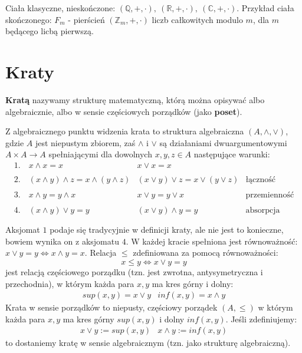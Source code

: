 \begin{przyk}
Ciała klasyczne, nieskończone: $(\mathbb{Q},+,\cdot),\ (\mathbb{R},+,\cdot),\ (\mathbb{C},+,\cdot)$. Przykład ciała skończonego: $F_m$ - pierścień $(\mathbb{Z}_m,+,\cdot)$ liczb całkowitych modulo $m$, dla $m$ będącego licbą pierwszą.
\end{przyk}

\section{Kraty}

\begin{df}
\textbf{Kratą} nazywamy strukturę matematyczną, którą można opisywać albo algebraicznie, albo w sensie częściowych porządków (jako \textbf{poset}).

Z algebraicznego punktu widzenia krata to struktura algebraiczna $(A,\wedge,\vee)$, gdzie $A$ jest niepustym zbiorem, zaś $\wedge$ i $\vee$ są działaniami dwuargumentowymi $A\times A\rightarrow A$ spełniającymi dla dowolnych $x,y,z\in A$ następujące warunki:
$$\begin{array}{lll}
1.\quad x\wedge x=x & x\vee x=x\\
\\
2.\quad (x\wedge y)\wedge z=x\wedge (y\wedge z) & (x\vee y)\vee z=x\vee(y\vee z) & \textrm{łączność}\\
\\
3.\quad x\wedge y=y\wedge x & x\vee y=y\vee x & \textrm{przemienność}\\
\\
4.\quad (x\wedge y)\vee y=y & (x\vee y)\wedge y=y & \textrm{absorpcja}\\
\\
\end{array}$$
Aksjomat $1$ podaje się tradycyjnie w definicji kraty, ale nie jest to konieczne, bowiem wynika on z aksjomatu $4$. W każdej kracie spełniona jest równoważność: $x\vee y=y\Leftrightarrow x\wedge y=x$. Relacja $\leq$ zdefiniowana za pomocą równoważności: $$x\leq y\Leftrightarrow x\vee y=y$$ jest relacją częściowego porządku (tzn. jest zwrotna, antysymetryczna i przechodnia), w którym każda para $x,y$ ma kres górny i dolny:
$$\begin{array}{ll}
sup(x,y)=x\vee y & inf(x,y)=x\wedge y
\end{array}$$
Krata w sensie porządków to niepusty, częściowy porządek $(A,\leq)$ w którym każda para $x,y$ ma kres górny $sup(x,y)$ i dolny $inf(x,y)$. Jeśli zdefiniujemy:
$$\begin{array}{ll}
x\vee y:=sup(x,y) & x\wedge y:=inf(x,y)
\end{array}$$
to dostaniemy kratę w sensie algebraicznym (tzn. jako strukturę algebraiczną).
\end{df}

